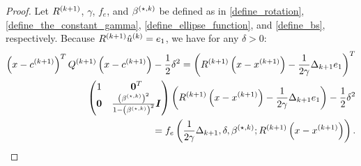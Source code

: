 \begin{proof}

Let ${R^{(k+1)}}$, $\gamma$, $f_e$, and ${\beta^{(\star, k)}}$ be defined as in \cref{define_rotation}, \cref{define_the_constant_gamma}, \cref{define_ellipse_function}, and \cref{define_bs}, respectively.
Because ${R^{(k+1)}}{{\hat u}^{(k)}} = e_1$, we have for any $\delta > 0$:
\begin{align*}
\left(x - {c^{(k+1)}}\right)^T{Q^{(k+1)}}\left(x - {c^{(k+1)}}\right) - \frac 1 2 \delta^2 
= \left({R^{(k+1)}}\left(x-{{x}^{(k+1)}}\right) - \frac 1 {2\gamma} \Delta_{k+1} e_1\right)^T \\ \begin{pmatrix}
1 & \boldsymbol0^T \\
\boldsymbol 0 & \frac{\left({\beta^{(\star, k)}}\right)^2}{1 - \left({\beta^{(\star, k)}}\right)^2} \boldsymbol I \\
\end{pmatrix} \left({R^{(k+1)}}\left(x-{{x}^{(k+1)}}\right) - \frac 1 {2\gamma} \Delta_{k+1} e_1\right) - \frac 1 2 \delta^2 \\
= f_e\left(\frac 1 {2\gamma} \Delta_{k+1}, \delta, {\beta^{(\star, k)}}; {R^{(k+1)}}\left(x - {{x}^{(k+1)}}\right)\right).
\end{align*}




\end{proof}
